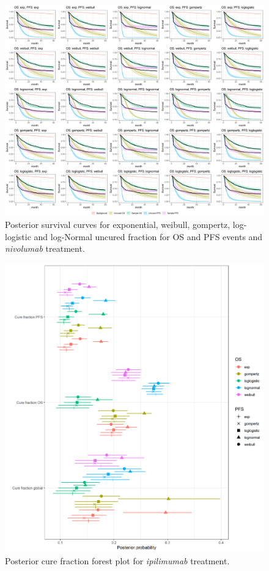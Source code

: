 \documentclass[AMA,STIX1COL]{WileyNJD-v2}
\begin{document}
\begin{figure}
\includegraphics[width=0.9\linewidth]{plot_S_grid_NIVOLUMAB.png}
\caption{\label{fig:S_grid_nivo} Posterior survival curves for exponential, weibull, gompertz, log-logistic and log-Normal uncured fraction for OS and PFS events and {\it nivolumab} treatment.}
\end{figure}


\begin{figure}[H]
\centering
\includegraphics[width=0.6\linewidth]{forest_plot_IPILIMUMAB.png}
\caption{\label{fig:cf_forest_ipi} Posterior cure fraction forest plot for {\it ipilimumab} treatment.}
\end{figure}
\end{document}
